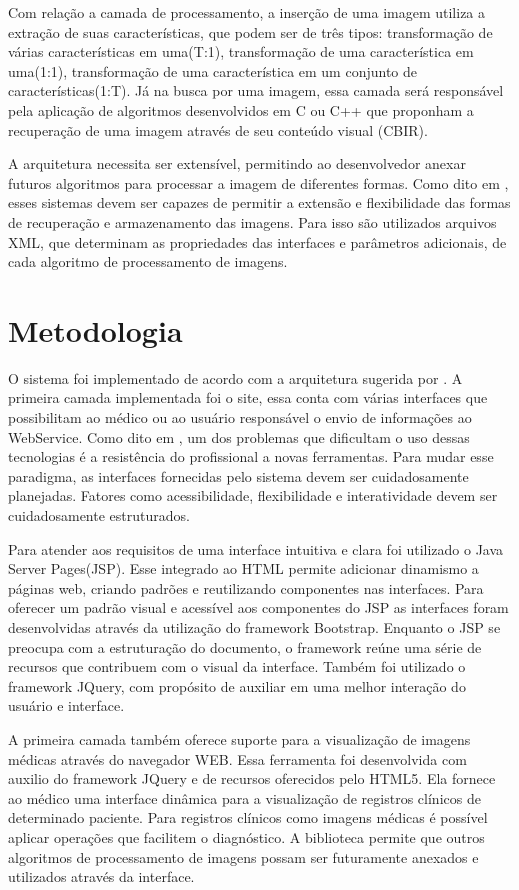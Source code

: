 Com relação a camada de processamento, a inserção de uma imagem utiliza a extração de suas características, que podem ser de três tipos: transformação de várias características em uma(T:1), transformação de uma característica em uma(1:1), transformação de uma característica em um conjunto de características(1:T)\cite{REF10}.
Já na busca por uma imagem, essa camada será responsável pela aplicação de algoritmos desenvolvidos em C ou C++ que proponham a recuperação de uma imagem através de seu conteúdo visual (CBIR).

A arquitetura necessita ser extensível, permitindo ao desenvolvedor anexar futuros algoritmos para processar a imagem de diferentes formas.
Como dito em \cite{REF18}, esses sistemas devem ser capazes de permitir a extensão e flexibilidade das formas de recuperação e armazenamento das imagens.
Para isso são utilizados arquivos XML, que determinam as propriedades das interfaces e parâmetros adicionais, de cada algoritmo de processamento de imagens.

\section{\esp Metodologia}


O sistema foi implementado de acordo com a arquitetura sugerida por \cite{REF10}.
A primeira camada implementada foi o site, essa conta com várias interfaces que possibilitam ao médico ou ao usuário responsável o envio de informações ao WebService.
Como dito em \cite{REF09}, um dos problemas que dificultam o uso dessas tecnologias é a resistência do profissional a novas ferramentas.
Para mudar esse paradigma, as interfaces fornecidas pelo sistema devem ser cuidadosamente planejadas.
Fatores como acessibilidade, flexibilidade e interatividade devem ser cuidadosamente estruturados.

Para atender aos requisitos de uma interface intuitiva e clara foi utilizado o Java Server Pages(JSP).
Esse integrado ao HTML permite adicionar dinamismo a páginas web, criando padrões e reutilizando componentes nas interfaces.
Para oferecer um padrão visual e acessível aos componentes do JSP as interfaces foram desenvolvidas através da utilização do framework Bootstrap.
Enquanto o JSP se preocupa com a estruturação do  documento, o framework reúne uma série de recursos que contribuem com o visual da interface. Também foi utilizado o framework JQuery, com propósito de auxiliar em uma melhor interação do usuário e interface.

A primeira camada também oferece suporte para a visualização de imagens médicas através do navegador WEB. Essa ferramenta foi desenvolvida com auxilio do framework JQuery e de recursos oferecidos pelo HTML5. Ela fornece ao médico uma interface dinâmica para a visualização de registros clínicos de determinado paciente. Para registros clínicos como imagens médicas é possível aplicar operações que facilitem o diagnóstico. A biblioteca permite que outros algoritmos de processamento de imagens possam ser futuramente anexados e utilizados através da interface.

